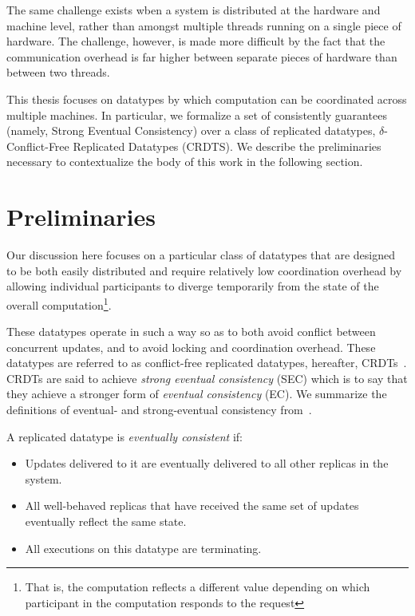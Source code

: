 The same challenge exists wben a system is distributed at the hardware and
machine level, rather than amongst multiple threads running on a single piece of
hardware. The challenge, however, is made more difficult by the fact that the
communication overhead is far higher between separate pieces of hardware than
between two threads.

This thesis focuses on datatypes by which computation can be coordinated across
multiple machines. In particular, we formalize a set of consistently guarantees
(namely, Strong Eventual Consistency) over a class of replicated datatypes,
$\delta$-Conflict-Free Replicated Datatypes (CRDTS). We describe the
preliminaries necessary to contextualize the body of this work in the following
section.

\section{Preliminaries}
Our discussion here focuses on a particular class of datatypes that are designed
to be both easily distributed and require relatively low coordination overhead
by allowing individual participants to diverge temporarily from the state of the
overall computation\footnote{That is, the computation reflects a different
value depending on which participant in the computation responds to the
request}.

These datatypes operate in such a way so as to both avoid conflict between
concurrent updates, and to avoid locking and coordination overhead. These
datatypes are referred to as conflict-free replicated datatypes, hereafter,
CRDTs~\citep{shapiro11}. CRDTs are said to achieve \textit{strong eventual
consistency} (SEC) which is to say that they achieve a stronger form of
\textit{eventual consistency} (EC). We summarize the definitions of eventual-
and strong-eventual consistency from~\cite{shapiro11}.

\begin{definition}
  \label{def:eventual-consistency}
  A replicated datatype is \textit{eventually consistent} if:
  \begin{itemize}
    \item Updates delivered to it are eventually delivered to all other replicas
      in the system.
    \item All well-behaved replicas that have received the same set of updates
      eventually reflect the same state.
    \item All executions on this datatype are terminating.
  \end{itemize}
\end{definition}

